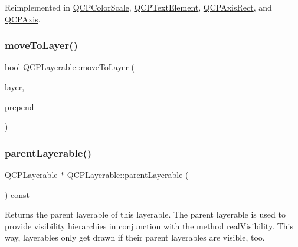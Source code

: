 Reimplemented in \mbox{\hyperlink{class_q_c_p_color_scale_a6a35dd39ab4e5cb2d7b29ebb4d5b61b0}{Q\+C\+P\+Color\+Scale}}, \mbox{\hyperlink{class_q_c_p_text_element_acfcbaf9b1da18745e72726aafb39c855}{Q\+C\+P\+Text\+Element}}, \mbox{\hyperlink{class_q_c_p_axis_rect_a6c89b988d3a0b93c0878f0ebdb5037f4}{Q\+C\+P\+Axis\+Rect}}, and \mbox{\hyperlink{class_q_c_p_axis_a780bee321fc6476e5fc49c4980291a01}{Q\+C\+P\+Axis}}.

\mbox{\label{class_q_c_p_layerable_af94484cfb7cbbddb7de522e9be71d9a4}} 
\subsubsection{\texorpdfstring{moveToLayer()}{moveToLayer()}}
{\footnotesize\ttfamily bool Q\+C\+P\+Layerable\+::move\+To\+Layer (\begin{DoxyParamCaption}\item[{\mbox{\hyperlink{class_q_c_p_layer}{Q\+C\+P\+Layer}} $\ast$}]{layer,  }\item[{bool}]{prepend }\end{DoxyParamCaption})\hspace{0.3cm}{\ttfamily [protected]}}

\mbox{\label{class_q_c_p_layerable_aa78b7e644d2c519e1a9a6f2ac5fcd858}} 
\subsubsection{\texorpdfstring{parentLayerable()}{parentLayerable()}}
{\footnotesize\ttfamily \mbox{\hyperlink{class_q_c_p_layerable}{Q\+C\+P\+Layerable}} $\ast$ Q\+C\+P\+Layerable\+::parent\+Layerable (\begin{DoxyParamCaption}{ }\end{DoxyParamCaption}) const\hspace{0.3cm}{\ttfamily [inline]}}

Returns the parent layerable of this layerable. The parent layerable is used to provide visibility hierarchies in conjunction with the method \mbox{\hyperlink{class_q_c_p_layerable_ab054e88f15d485defcb95e7376f119e7}{real\+Visibility}}. This way, layerables only get drawn if their parent layerables are visible, too.

